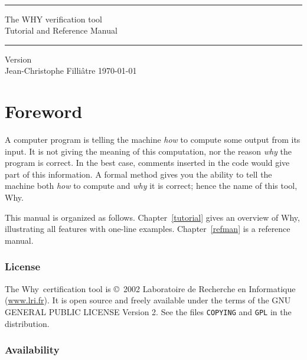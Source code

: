 \documentclass[a4paper,12pt]{report}
\newcommand{\why}{\textsf{Why}}
\begin{document}
\thispagestyle{empty}
\begin{center}
~\\[3cm]
\rule\textwidth{0.1cm}\\[0.5cm]
{\Huge\sf The WHY verification tool}\\[1cm]
{\Large\sf Tutorial and Reference Manual}\\[0.1cm]
\rule\textwidth{0.1cm}\\[1cm]
Version \whyversion\\[3cm]
Jean-Christophe Filli\^atre
\vfill
\today\\
\end{center}


\tableofcontents

\chapter*{Foreword}

A computer program is telling the machine \emph{how} to compute some
output from its input. It is not giving the meaning of this
computation, nor the reason \emph{why} the program is correct. In the
best case, comments inserted in the code would give part of this
information. A formal method gives you the ability to tell the
machine both \emph{how} to compute and \emph{why} it is correct; hence
the name of this tool, \why.


\medskip

This manual is organized as follows. Chapter~\ref{tutorial} gives an
overview of \why, illustrating all features with one-line examples.
Chapter~\ref{refman} is a reference manual.


\subsection*{License}

The \why\ certification tool is \copyright\ 2002 Laboratoire de
Recherche en Informatique (\url{www.lri.fr}).
It is open source and freely available under the terms of the GNU
GENERAL PUBLIC LICENSE Version 2. See the files \texttt{COPYING} and
\texttt{GPL} in the distribution.


\subsection*{Availability}
\end{document}
